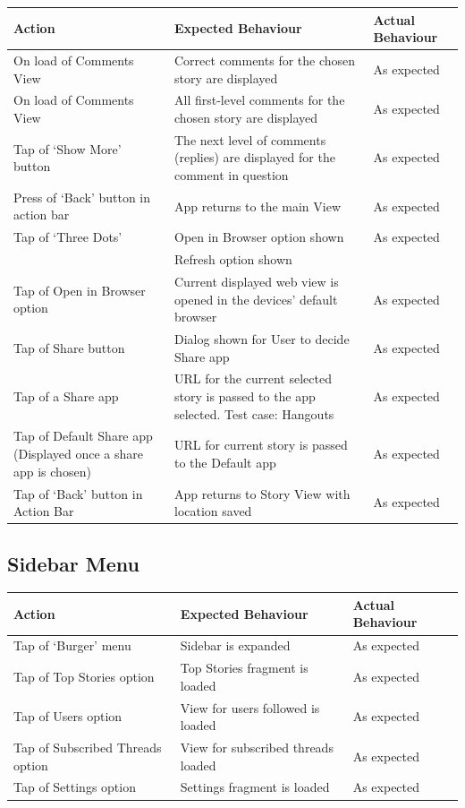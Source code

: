 \documentclass[11pt]{article}
\begin{document}
\begin{center}
\begin{tabular}{ | p{5cm} | p{5cm} | p{5cm} |}
	\hline
	\textbf{Action} & \textbf{Expected Behaviour} & \textbf{Actual Behaviour} \\
	\hline
	On load of Comments View & Correct comments for the chosen story are displayed & As expected \\
	\hline
	On load of Comments View & All first-level comments for the chosen story are displayed & As expected \\
	\hline
	Tap of ‘Show More’ button & The next level of comments (replies) are displayed for the comment in question & As expected \\
	\hline
	Press of ‘Back’ button in action bar & App returns to the main View & As expected \\
	\hline
	Tap of ‘Three Dots’ & Open in Browser option shown & As expected \\ & Refresh option shown & \\
	\hline
	Tap of Open in Browser option & Current displayed web view is opened in the devices’ default browser & As expected \\
	\hline
	Tap of Share button & Dialog shown for User to decide Share app & As expected \\
	\hline
	Tap of a Share app & URL for the current selected story is passed to the app selected. Test case: Hangouts & As expected \\
	\hline
	Tap of Default Share app (Displayed once a share app is chosen) & URL for current story is passed to the Default app & As expected \\
	\hline
	Tap of ‘Back’ button in Action Bar & App returns to Story View with location saved & As expected \\
	\hline
\end{tabular}
\end{center}

\subsection*{Sidebar Menu}
\begin{center}
\begin{tabular}{ | p{5cm} | p{5cm} | p{5cm} |}
	\hline
	\textbf{Action} & \textbf{Expected Behaviour} & \textbf{Actual Behaviour} \\
	\hline
	Tap of ‘Burger’ menu & Sidebar is expanded & As expected \\
	\hline
	Tap of Top Stories option & Top Stories fragment is loaded & As expected \\
	\hline
	Tap of Users option & View for users followed is loaded & As expected \\
	\hline
	Tap of Subscribed Threads option & View for subscribed threads loaded & As expected \\
	\hline
	Tap of Settings option & Settings fragment is loaded & As expected \\
	\hline
\end{tabular}
\end{center}
\end{document}
